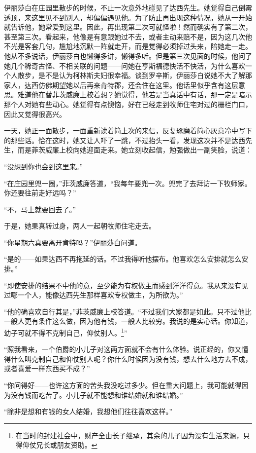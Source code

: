 \par 伊丽莎白在庄园里散步的时候，不止一次意外地碰见了达西先生。她觉得自己倒霉透顶，来这里见不到别人，却偏偏遇见他。为了防止再出现这种情况，她从一开始就告诉他，她常爱到这里。因此，再出现第二次可就怪啦！然而确实有了第二次，甚至第三次。看起来，他像是有意跟她过不去，或者主动来赔不是，因为这几次他不光是客套几句，尴尬地沉默一阵就走开，而是觉得必须掉过头来，陪她走一走。他从不多说话，伊丽莎白也懒得多讲，懒得多听。但是第三次见面的时候，他问了她几个稀奇古怪、不相关联的问题——问她在亨斯福德快活不快活，为什么喜欢一个人散步，是不是认为柯林斯夫妇很幸福。谈到罗辛斯，伊丽莎白说她不大了解那家人，达西仿佛期望她以后再来肯特郡，还会住在这里。他话里似乎含有这层意思。难道他在替菲茨威廉上校着想？她觉得，他若是当真话中有话，那一定是暗示那个人对她有些动心。她觉得有点懊恼，好在已经走到牧师住宅对过的栅栏门口，因此又觉得很高兴。
\par 一天，她正一面散步，一面重新读着简上次的来信，反复琢磨着简心灰意冷中写下的那些话。恰在这时，她又让人吓了一跳，不过抬头一看，发现这次并不是达西先生，而是菲茨威廉上校向她迎面走来。她立刻收起信，勉强做出一副笑脸，说道：
\par “没想到你也会到这里来。”
\par “在庄园里兜一圈，”菲茨威廉答道，“我每年要兜一次。兜完了去拜访一下牧师家。你还要往前走好远吗？”
\par “不，马上就要回去了。”
\par 于是，她果真转过身，两人一起朝牧师住宅走去。
\par “你星期六真要离开肯特吗？”伊丽莎白问道。
\par “是的——如果达西不再拖延的话。不过我得听他摆布。他喜欢怎么安排就怎么安排。”
\par “即使安排的结果不中他的意，至少能为有权做主而感到洋洋得意。我从来没有见过哪一个人，能像达西先生那样喜欢专权做主，为所欲为。”
\par “他的确喜欢自行其是，”菲茨威廉上校答道。“不过我们大家都是如此。只不过他比一般人更有条件这么做，因为他有钱，一般人比较穷。我说的是实心话。你知道，幼子可就不得不克制自己，仰仗别人。\footnote{在当时的封建社会中，财产全由长子继承，其余的儿子因为没有生活来源，只得仰仗兄长或朋友资助。}”
\par “照我看来，一个伯爵的小儿子对这两方面就不会有什么体验。说正经的，你又懂得什么叫克制自己和仰仗别人呢？你什么时候因为没有钱，想去什么地方去不成，或者喜爱一样东西买不成？”
\par “你问得好——也许这方面的苦头我没吃过多少。但在重大问题上，我可能就得因为没有钱而吃苦了。小儿子就不能想和谁结婚就和谁结婚。”
\par “除非是想和有钱的女人结婚，我想他们往往喜欢这样。”
